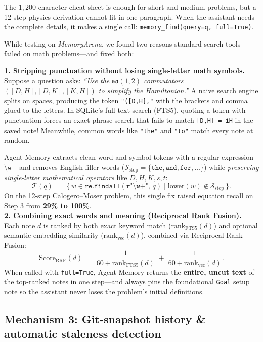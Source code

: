 \documentclass[11pt,a4paper]{article}
\begin{document}
The $1{,}200$-character cheat sheet is enough for short and medium problems, but a 12-step physics derivation cannot fit in one paragraph. When the assistant needs the complete details, it makes a single call: \texttt{memory\_find(query=q, full=True)}.

While testing on \emph{MemoryArena}, we found two reasons standard search tools failed on math problems---and fixed both:

\begin{mathbox}
\textbf{1. Stripping punctuation without losing single-letter math symbols.}
Suppose a question asks: \emph{``Use the $\mathfrak{so}(1,2)$ commutators $([D,H], [D,K], [K,H])$ to simplify the Hamiltonian.''}
A naive search engine splits on spaces, producing the token \texttt{"([D,H],"} with the brackets and comma glued to the letters. In SQLite's full-text search (FTS5), quoting a token with punctuation forces an exact phrase search that fails to match \texttt{[D,H] = iH} in the saved note! Meanwhile, common words like \texttt{"the"} and \texttt{"to"} match every note at random.

Agent Memory extracts clean word and symbol tokens with a regular expression $\texttt{\textbackslash w+}$ and removes English filler words ($\mathcal{S}_{\text{stop}} = \{\texttt{the}, \texttt{and}, \texttt{for}, \dots\}$) while \emph{preserving single-letter mathematical operators} like $D, H, K, s, t$:
\[
  \mathcal{T}(q) \;=\; \Big\{\, w \in \texttt{re.findall}(\texttt{r"\textbackslash w+"},\, q) \;\Big|\; \text{lower}(w) \notin \mathcal{S}_{\text{stop}} \,\Big\}.
\]
On the 12-step Calogero--Moser problem, this single fix raised equation recall on Step 3 from \textbf{29\% to 100\%}.\\[4pt]
\textbf{2. Combining exact words and meaning (Reciprocal Rank Fusion).}
Each note $d$ is ranked by both exact keyword match ($\text{rank}_{\text{FTS5}}(d)$) and optional semantic embedding similarity ($\text{rank}_{\text{vec}}(d)$), combined via Reciprocal Rank Fusion:
\[
  \text{Score}_{\text{RRF}}(d) \;=\; \frac{1}{60 + \text{rank}_{\text{FTS5}}(d)} \;+\; \frac{1}{60 + \text{rank}_{\text{vec}}(d)}.
\]
When called with \texttt{full=True}, Agent Memory returns the \textbf{entire, uncut text} of the top-ranked notes in one step---and always pins the foundational \texttt{Goal} setup note so the assistant never loses the problem's initial definitions.
\end{mathbox}

\subsection{Mechanism 3: Git-snapshot history \& automatic staleness detection}
\end{document}

